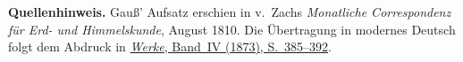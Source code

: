 \par\medskip\begin{small}\noindent\textbf{Quellenhinweis.} Gauß' Aufsatz erschien in v.\ Zachs \textit{Monatliche Correspondenz für Erd- und Himmelskunde}, August 1810. Die Übertragung in modernes Deutsch folgt dem Abdruck in \href{https://gdz.sub.uni-goettingen.de/id/PPN236005081}{\textit{Werke}, Band~IV (1873), S.~385--392}.\par\end{small}
